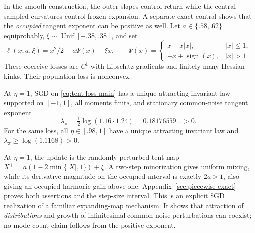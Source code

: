 In the smooth construction, the outer slopes control return while the central sampled curvatures control frozen expansion. A separate exact control shows that the \emph{occupied} tangent exponent can be positive as well. Let $a\in\{.58,.62\}$ equiprobably, $\xi\sim\operatorname{Unif}[-.38,.38]$, and set
\begin{equation}
 \ell(x;a,\xi)=x^2/2-a\Psi(x)-\xi x,\qquad
 \Psi(x)=\begin{cases}x-x|x|,&|x|\le1,\\-x+\operatorname{sign}(x),&|x|>1.\end{cases}
 \label{eq:tent-loss-main}
\end{equation}
These coercive losses are $C^1$ with Lipschitz gradients and finitely many Hessian kinks. Their population loss is nonconvex.
\begin{theorem}
\label{thm:occupied-positive}
At $\eta=1$, SGD on \eqref{eq:tent-loss-main} has a unique attracting invariant law supported on $[-1,1]$, all moments finite, and stationary common-noise tangent exponent
\begin{equation}
 \lambda_\pi=\tfrac12\log(1.16\cdot1.24)=0.18176569\ldots>0.
 \label{eq:tent-positive}
\end{equation}
For the same loss, all $\eta\in[.98,1]$ have a unique attracting invariant law and $\lambda_\pi\ge\log(1.1168)>0$.
\end{theorem}
At $\eta=1$, the update is the randomly perturbed tent map $X^+=a(1-2\min\{|X|,1\})+\xi$. A two-step minorization gives uniform mixing, while its derivative magnitude on the occupied interval is exactly $2a>1$, also giving an occupied harmonic gain above one. Appendix~\ref{sec:piecewise-exact} proves both assertions and the step-size interval. This is an explicit SGD realization of a familiar expanding-map mechanism. It shows that attraction of \emph{distributions} and growth of infinitesimal common-noise perturbations can coexist; no mode-count claim follows from the positive exponent.
